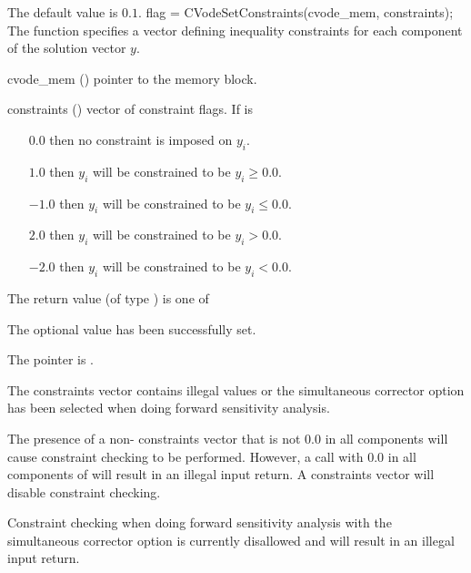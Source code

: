 {
  The default value is $0.1$.
}
{
flag = CVodeSetConstraints(cvode\_mem, constraints);
}
{
  The function  specifies a vector defining
  inequality constraints for each component of the solution vector $y$.
}
{
  \begin{args}
  \item[cvode\_mem] ()
    pointer to the {\cvodes} memory block.
  \item[constraints] ()
    vector of constraint flags. If  is
    \begin{itemize}
    \item[$0.0$] then no constraint is imposed on $y_i$.
    \item[$1.0$] then $y_i$ will be constrained to be $y_i \ge 0.0$.
    \item[$-1.0$] then $y_i$ will be constrained to be $y_i \le 0.0$.
    \item[$2.0$] then $y_i$ will be constrained to be $y_i > 0.0$.
    \item[$-2.0$] then $y_i$ will be constrained to be $y_i < 0.0$.
    \end{itemize}
  \end{args}
}
{
  The return value  (of type ) is one of
  \begin{args}
  \item[\Id{CV\_SUCCESS}]
    The optional value has been successfully set.
  \item[\Id{CV\_MEM\_NULL}]
    The  pointer is .
  \item[\Id{CV\_ILL\_INPUT}]
    The constraints vector contains illegal values or the simultaneous corrector
    option has been selected when doing forward sensitivity analysis.
  \end{args}
}
{
  The presence of a non- constraints vector that is not $0.0$ in
  all components will cause constraint checking to be performed.
  However, a call with $0.0$ in all components of  will
  result in an illegal input return. A  constraints vector will disable
  constraint checking.

  Constraint checking when doing forward sensitivity analysis with the
  simultaneous corrector option is currently disallowed and will result in an
  illegal input return.
}

